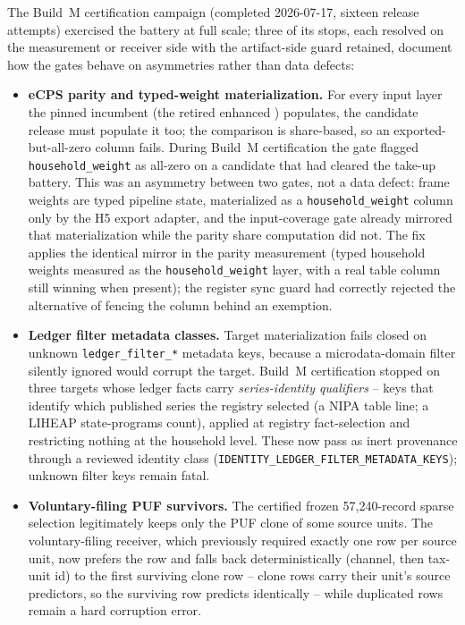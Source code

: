 The Build~M certification campaign (completed 2026-07-17, sixteen
release attempts) exercised the battery at full scale; three of its stops, each resolved on
the measurement or receiver side with the artifact-side guard retained,
document how the gates behave on asymmetries rather than data defects:

\begin{itemize}
\item \textbf{eCPS parity and typed-weight materialization.} For every
input layer the pinned incumbent (the retired enhanced \cps{}) populates,
the candidate release must populate it too; the comparison is share-based,
so an exported-but-all-zero column fails.
 During Build~M certification the gate flagged
\texttt{household\_weight} as all-zero on a candidate that had cleared the
take-up battery. This was an asymmetry between two gates, not a data
defect: frame weights are typed pipeline state, materialized as a
\texttt{household\_weight} column only by the H5 export adapter, and the
input-coverage gate already mirrored that materialization while the parity
share computation did not. The fix applies the identical mirror in the
parity measurement (typed household weights measured as the
\texttt{household\_weight} layer, with a real table column still winning
when present); the register sync guard had correctly rejected the
alternative of fencing the column behind an exemption.
\item \textbf{Ledger filter metadata classes.} Target materialization
fails closed on unknown \texttt{ledger\_filter\_*} metadata keys, because
a microdata-domain filter silently ignored would corrupt the target.
Build~M certification stopped on three targets whose ledger facts carry
\emph{series-identity qualifiers} -- keys that identify which published
series the registry selected (a NIPA table line; a LIHEAP state-programs
count), applied at registry fact-selection and restricting nothing at the
household level. These now pass as inert provenance through a reviewed
identity class (\texttt{IDENTITY\_LEDGER\_FILTER\_METADATA\_KEYS});
unknown filter keys remain fatal.
\item \textbf{Voluntary-filing PUF survivors.} The certified frozen
57{,}240-record sparse selection legitimately keeps only the PUF clone of
some source units. The voluntary-filing receiver, which previously
required exactly one \asec{} row per source unit, now prefers the \asec{}
row and falls back deterministically (channel, then tax-unit id) to the
first surviving clone row -- clone rows carry their unit's source
predictors, so the surviving row predicts identically -- while duplicated
\asec{} rows remain a hard corruption error.
\end{itemize}

